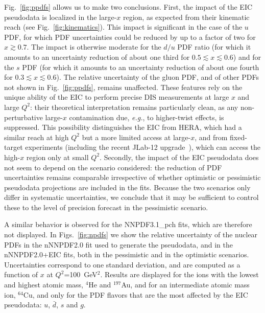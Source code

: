\documentclass[11pt,a4paper]{article}
\begin{document}
Fig.~\ref{fig:ppdfs} allows us to make two conclusions. First, the impact of the
EIC pseudodata is localized in the large-$x$ region, as expected from their
kinematic reach (see Fig.~\ref{fig:kinematics}). This impact is significant in
the case of the $u$ PDF, for which PDF uncertainties could be reduced by up to
a factor of two for $x\gtrsim 0.7$. The impact is otherwise moderate for the
$d/u$ PDF ratio (for which it amounts to an uncertainty reduction of about
one third for $0.5\lesssim x \lesssim 0.6$) and for the $s$ PDF (for which 
it amounts to an uncertainty reduction of about one fourth for
$0.3\lesssim x \lesssim 0.6$). The relative uncertainty of the gluon PDF, and
of other PDFs not shown in Fig.~\ref{fig:ppdfs}, remains unaffected.
These features rely on the unique ability of the EIC to perform precise DIS
measurements at large $x$ and large $Q^2$: their theoretical interpretation
remains particularly clean, as any non-perturbative large-$x$ contamination
due, {\it e.g.}, to higher-twist effects, is suppressed. This possibility
distinguishes the EIC from HERA, which had a similar reach at high $Q^2$ but a
more limited access at large-$x$, and from fixed-target experiments
(including the recent JLab-12 upgrade~\cite{Dudek:2012vr}), which can access the
high-$x$ region only at small $Q^2$. Secondly, the impact of the EIC pseudodata
does not seem to depend on the scenario considered: the reduction of PDF
uncertainties remains comparable irrespective of whether optimistic or
pessimistic pseudodata projections are included in the fits. Because the two
scenarios only differ in systematic uncertainties, we conclude that it may be
sufficient to control these to the level of precision forecast
in the pessimistic scenario.

A similar behavior is observed for the NNPDF3.1\_pch fits, which are therefore
not displayed. In Figs.~\ref{fig:npdfs} we show the relative uncertainty of the
nuclear PDFs in the nNNPDF2.0 fit used to generate the pseudodata, and in the
nNNPDF2.0+EIC fits, both in the pessimistic and in the optimistic scenarios.
Uncertainties correspond to one standard deviation, and
are computed as a function of $x$ at $Q^2$=100~GeV$^2$. Results
are displayed for the ions with the lowest and highest atomic mass, $^4$He and
$^{197}$Au, and for an intermediate atomic mass ion, $^{64}$Cu,
and only for the PDF flavors that are the most affected by
the EIC pseudodata: $u$, $\bar{d}$, $s$ and $g$.
\end{document}
